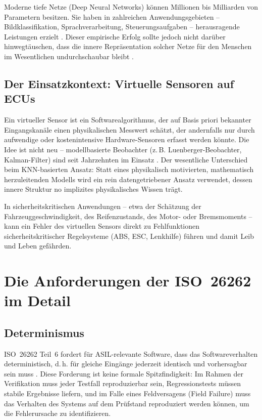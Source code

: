 ﻿\documentclass[12pt,a4paper]{article}
\begin{document}
Moderne tiefe Netze (Deep Neural Networks) k\"onnen Millionen bis Milliarden von
Parametern besitzen. Sie haben in zahlreichen Anwendungsgebieten -- Bildklassifikation,
Sprachverarbeitung, Steuerungsaufgaben -- herausragende Leistungen erzielt
\cite{LeCun2015}. Dieser empirische Erfolg sollte jedoch nicht dar\"uber hinwegt\"auschen,
dass die innere Repr\"asentation solcher Netze f\"ur den Menschen im Wesentlichen
undurchschaubar bleibt \cite{Lipton2018}.

\subsection{Der Einsatzkontext: Virtuelle Sensoren auf ECUs}
\label{subsec:virtueller_sensor}

Ein virtueller Sensor ist ein Softwarealgorithmus, der auf Basis priori bekannter
Eingangskan\"ale einen physikalischen Messwert sch\"atzt, der andernfalls nur durch
aufwendige oder kostenintensive Hardware-Sensoren erfasst werden k\"onnte. Die Idee
ist nicht neu -- modellbasierte Beobachter (z.\,B. Luenberger-Beobachter, Kalman-Filter)
sind seit Jahrzehnten im Einsatz \cite{Leveson2011}. Der wesentliche Unterschied
beim KNN-basierten Ansatz: Statt eines physikalisch motivierten, mathematisch
herzuleitenden Modells wird ein rein datengetriebener Ansatz verwendet, dessen
innere Struktur no implizites physikalisches Wissen tr\"agt.

In sicherheitskritischen Anwendungen -- etwa der Sch\"atzung der Fahrzeuggeschwindigkeit,
des Reifenzustands, des Motor- oder Bremsmoments -- kann ein Fehler des virtuellen
Sensors direkt zu Fehlfunktionen sicherheitskritischer Regelsysteme (ABS, ESC,
Lenkhilfe) f\"uhren und damit Leib und Leben gef\"ahrden.

\section{Die Anforderungen der ISO~26262 im Detail}
\label{sec:iso}

\subsection{Determinismus}
\label{subsec:determinismus}

ISO~26262 Teil~6 fordert f\"ur ASIL-relevante Software, dass das Softwareverhalten
deterministisch, d.\,h. f\"ur gleiche Eing\"ange jederzeit identisch und vorhersagbar
sein muss \cite{iso26262_6}. Diese Forderung ist keine formale Spitzfindigkeit: Im
Rahmen der Verifikation muss jeder Testfall reproduzierbar sein, Regressionstests
m\"ussen stabile Ergebnisse liefern, und im Falle eines Feldversagens (Field Failure)
muss das Verhalten des Systems auf dem Pr\"ufstand reproduziert werden k\"onnen,
um die Fehlerursache zu identifizieren.
\end{document}

